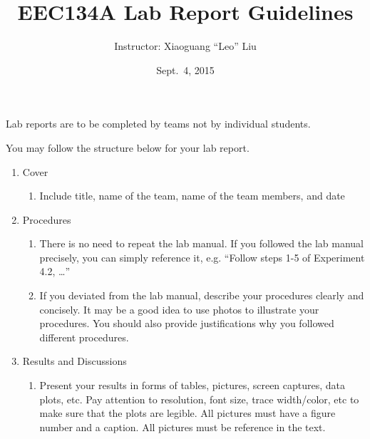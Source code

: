 \documentclass[letterpaper, 11pt]{article}
\title{EEC134A Lab Report Guidelines}
\author{Instructor: Xiaoguang ``Leo'' Liu}
\date{Sept.~4, 2015}
\begin{document}
\maketitle

Lab reports are to be completed by teams not by individual students. 

You may follow the structure below for your lab report. 

\begin{enumerate}
	\item Cover
		\begin{enumerate}
			\item Include title, name of the team, name of the team members, and date 
		\end{enumerate}
	\item Procedures
		\begin{enumerate}
			\item There is no need to repeat the lab manual. If you followed the lab manual precisely, you can simply reference it, e.g. “Follow steps 1-5 of Experiment 4.2, …” 
			
			\item If you deviated from the lab manual, describe your procedures clearly and concisely. It may be a good idea to use photos to illustrate your procedures. You should also provide justifications why you followed different procedures. 
		\end{enumerate}
	\item Results and Discussions
		\begin{enumerate}
			\item Present your results in forms of tables, pictures, screen captures, data plots, etc. Pay attention to resolution, font size, trace width/color, etc to make sure that the plots are legible. All pictures must have a figure number and a caption. All pictures must be reference in the text.
			

\end{enumerate}
\end{enumerate}
\end{document}
